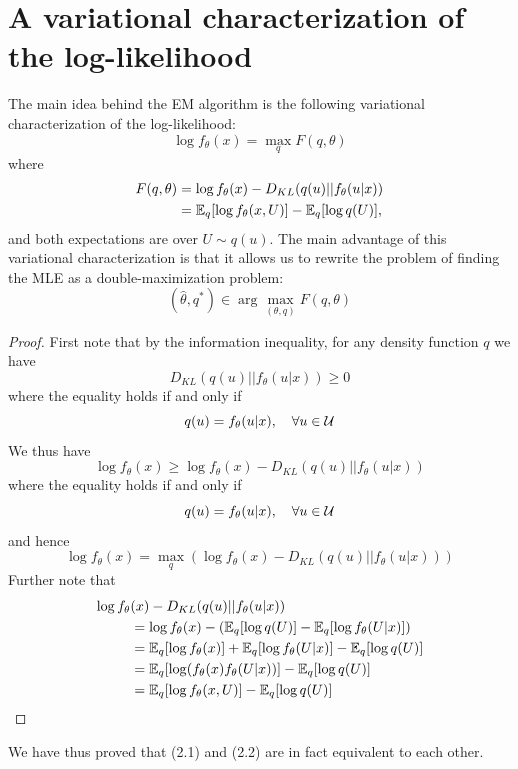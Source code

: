 \documentclass[11pt]{book}
\begin{document}
\section{A variational characterization of the log-likelihood}
The main idea behind the EM algorithm is the following variational characterization of the log-likelihood:
\[
  \log f_\theta(x) = \max_{q} F(q, \theta)
\] 
where 
\begin{align}
  F(q,\theta) &= \log f_\theta(x) - D_{KL}(q(u)|| f_\theta(u|x)) \\ 
              &= \mathbb{E}_q[\log f_\theta(x, U)] - \mathbb{E}_q[\log q(U)],
\end{align}
and both expectations are over $U \sim q(u)$. The main advantage of this variational characterization
is that it allows us to rewrite the problem of finding the MLE as a double-maximization problem: 
\[ 
  (\hat{\theta}, q^*) \in \arg \max_{(\theta, q)} F(q, \theta) 
\]
\begin{proof}
  First note that by the information inequality, for any density function $q$ we have 
  \[
    D_{KL}(q(u) || f_\theta(u|x)) \geq 0 
  \]
  where the equality holds if and only if 
  \[
    q(u) = f_\theta(u | x), \quad\forall u \in\mathcal{U} 
  \]
  We thus have
  \[
    \log f_\theta(x) \geq \log f_\theta(x) - D_{KL}(q(u) || f_\theta(u | x))
  \] 
  where the equality holds if and only if 
  \[
    q(u) = f_\theta(u | x), \quad\forall u \in \mathcal{U} 
  \] 
  and hence 
  \[
    \log f_\theta(x) = \max_{q} (\log f_\theta(x) - D_{KL}(q(u) || f_\theta(u|x)))
  \] 
  Further note that 
  \begin{align*}
    \log f_\theta&(x) - D_{KL}(q(u) || f_\theta(u | x)) \\
                 &= \log f_\theta(x) - (\mathbb{E}_q[\log q(U)] - \mathbb{E}_q[\log f_\theta(U|x)]) \\ 
                 &= \mathbb{E}_q [\log f_\theta(x)] + \mathbb{E}_q[\log f_\theta(U|x)] - \mathbb{E}_q[\log q(U)] \\ 
                 &= \mathbb{E}_q [\log (f_\theta(x)f_\theta(U|x))] - \mathbb{E}_q[\log q(U)] \\ 
                 &= \mathbb{E}_q[\log f_\theta(x, U)] - \mathbb{E}_q[\log q(U)]
  \end{align*}
\end{proof}
We have thus proved that (2.1) and (2.2) are in fact equivalent to each other. 
\end{document}
